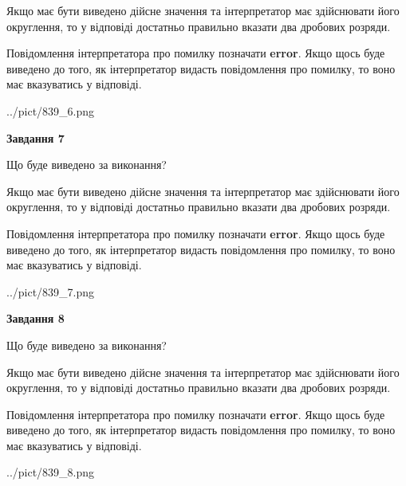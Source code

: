 \documentclass[12pt, ukrainian]{article}
\begin{document}
{\begin {Large}
Якщо має бути виведено дійсне значення та інтерпретатор має здійснювати його округлення, 
то у відповіді достатньо правильно вказати два дробових розряди.

Повідомлення інтерпретатора про помилку позначати \textbf{error}.
Якщо щось буде виведено до того, як інтерпретатор видасть повідомлення про помилку, 
то воно має вказуватись у відповіді. \par

\begin{center}
	{../pict/839_6.png}
\end{center}
\newpage

{\begin {center}\textbf{Завдання 7}\end {center}}\par
Що буде виведено за виконання? \par

Якщо має бути виведено дійсне значення та інтерпретатор має здійснювати його округлення, 
то у відповіді достатньо правильно вказати два дробових розряди.

Повідомлення інтерпретатора про помилку позначати \textbf{error}.
Якщо щось буде виведено до того, як інтерпретатор видасть повідомлення про помилку, 
то воно має вказуватись у відповіді. \par

\begin{center}
	{../pict/839_7.png}
\end{center}
\newpage

{\begin {center}\textbf{Завдання 8}\end {center}}\par
Що буде виведено за виконання? \par

Якщо має бути виведено дійсне значення та інтерпретатор має здійснювати його округлення, 
то у відповіді достатньо правильно вказати два дробових розряди.

Повідомлення інтерпретатора про помилку позначати \textbf{error}.
Якщо щось буде виведено до того, як інтерпретатор видасть повідомлення про помилку, 
то воно має вказуватись у відповіді. \par

\begin{center}
	{../pict/839_8.png}
\end{center}
\newpage


\end{Large}}
\end{document}
